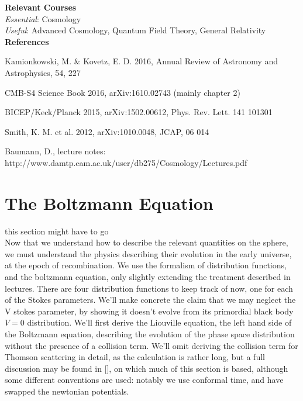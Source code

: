 \documentclass[a4paper,10pt]{article}
\begin{document}
\textbf{Relevant Courses}\\

\textit{Essential}: Cosmology\\

\textit{Useful}: Advanced Cosmology, Quantum Field Theory, General Relativity\\

\textbf{References}
\begin{enumerate}[label={[\arabic*]}]
\item {Kamionkowski, M. \& Kovetz, E. D. 2016, Annual Review of Astronomy and Astrophysics,
54, 227}
\item {CMB-S4 Science Book 2016, arXiv:1610.02743 (mainly chapter 2)}
\item {BICEP/Keck/Planck 2015, arXiv:1502.00612, Phys. Rev. Lett. 141 101301}
\item {Smith, K. M. et al. 2012, arXiv:1010.0048, JCAP, 06 014}
\item {Baumann, D., lecture notes: http://www.damtp.cam.ac.uk/user/db275/Cosmology/Lectures.pdf}
\end{enumerate}





\section{The Boltzmann Equation}

this section might have to go\\


Now that we understand how to describe the relevant quantities on the sphere, we must understand the physics describing their evolution in the early universe, at the epoch of recombination. We use the formalism of distribution functions, and the boltzmann equation, only slightly extending the treatment described in lectures. There are four distribution functions to keep track of now, one for each of the Stokes parameters. We'll make concrete the claim that we may neglect the V stokes parameter, by showing it doesn't evolve from its primordial black body $V=0$ distribution. We'll first derive the Liouville equation, the left hand side of the Boltzmann equation, describing the evolution of the phase space distribution without the presence of a collision term. We'll omit deriving the collision term for Thomson scattering in detail, as the calculation is rather long, but a full discussion may be found in [], on which much of this section is based, although some different conventions are used: notably we use conformal time, and have swapped the newtonian potentials.
\end{document}
